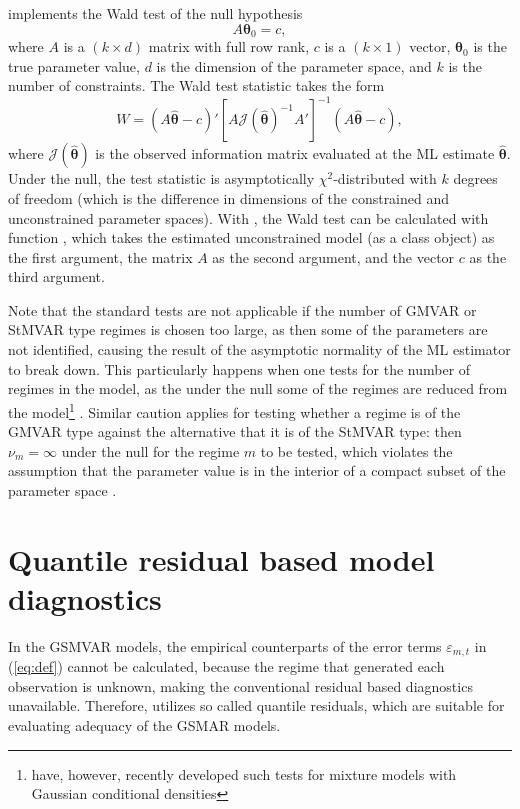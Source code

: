 \documentclass[nojss]{jss} %
\begin{document}
 implements the Wald test of the null hypothesis
\begin{equation}
A\boldsymbol{\theta}_0 = c,
\end{equation}
where $A$ is a $(k \times d)$ matrix with full row rank, $c$ is a $(k \times 1)$ vector, $\boldsymbol{\theta}_0$ is the true parameter value, $d$ is the dimension of the parameter space, and $k$ is the number of constraints. The Wald test statistic takes the form
\begin{equation}
W = (A\hat{\boldsymbol{\theta}} - c)' [A\mathcal{J}(\hat{\boldsymbol{\theta}})^{-1}A']^{-1}(A\hat{\boldsymbol{\theta}} - c),
\end{equation}
where $\mathcal{J}(\hat{\boldsymbol{\theta}})$ is the observed information matrix evaluated at the ML estimate $\hat{\boldsymbol{\theta}}$. Under the null, the test statistic is asymptotically $\chi^2$-distributed with $k$ degrees of freedom (which is the difference in dimensions of the constrained and unconstrained parameter spaces). With , the Wald test can be calculated with function , which takes the estimated unconstrained model (as a class  object) as the first argument, the matrix $A$ as the second argument, and the vector $c$ as the third argument.

Note that the standard tests are not applicable if the number of GMVAR or StMVAR type regimes is chosen too large, as then some of the parameters are not identified, causing the result of the asymptotic normality of the ML estimator to break down. This particularly happens when one tests for the number of regimes in the model, as the under the null some of the regimes are reduced from the model\footnote{\cite{Meitz+Saikkonen:2021} have, however, recently developed such tests for mixture models with Gaussian conditional densities} \citep[see the related discussion in][]{Virolainen2:2021}. Similar caution applies for testing whether a regime is of the GMVAR type against the alternative that it is of the StMVAR type: then $\nu_m = \infty$ under the null for the regime $m$ to be tested, which violates the assumption that the parameter value is in the interior of a compact subset of the parameter space \citep[see][Theorem 3 and Assumption 1]{Virolainen2:2021}.


\section{Quantile residual based model diagnostics}\label{sec:qres}
In the GSMVAR models, the empirical counterparts of the error terms $\varepsilon_{m,t}$ in (\ref{eq:def}) cannot be calculated, because the regime that generated each observation is unknown, making the conventional residual based diagnostics unavailable. Therefore,  utilizes so called quantile residuals, which are suitable for evaluating adequacy of the GSMAR models.
\end{document}
